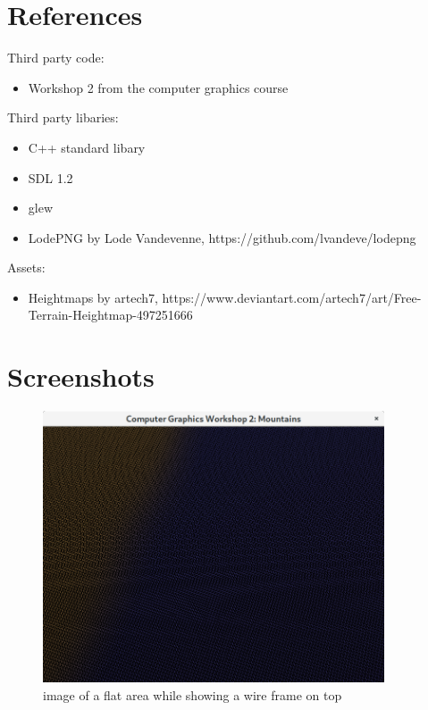 \documentclass[a4paper, 11pt]{article} %
\begin{document}
\newpage
\section*{References}
Third party code:
\begin{itemize}
\item Workshop 2 from the computer graphics course
\end{itemize}

Third party libaries:
\begin{itemize}
\item C++ standard libary
\item SDL 1.2
\item glew
\item LodePNG by Lode Vandevenne, https://github.com/lvandeve/lodepng
\end{itemize}

Assets:
\begin{itemize}
\item Heightmaps by artech7, https://www.deviantart.com/artech7/art/Free-Terrain-Heightmap-497251666
\end{itemize}








\section*{Screenshots}


\begin{figure}[ht]
\caption{image of a flat area while showing a wire frame on top}
\centering
\includegraphics[width=0.9\textwidth]{wire_frame}
\end{figure}
\end{document}
